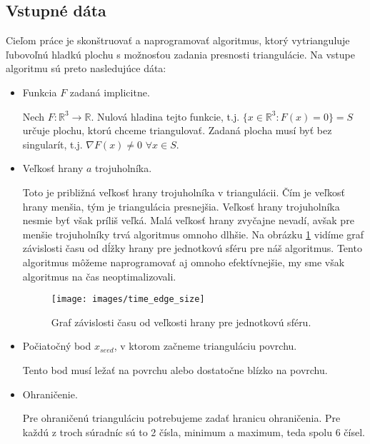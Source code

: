 \subsection{Vstupné dáta}
\label{kap:input_data}
Cieľom práce je skonštruovať a naprogramovať algoritmus, ktorý vytrianguluje ľubovoľnú hladkú plochu s 
možnosťou zadania presnosti triangulácie. Na vstupe algoritmu sú preto nasledujúce dáta:
\begin{itemize}
    \item{
        Funkcia $F$ zadaná implicitne.
        
        Nech $F:\mathbb{R}^3 \to \mathbb{R}$.
        Nulová hladina tejto funkcie, t.j. $\{x \in \mathbb{R}^3 : F(x) = 0\} = S$ určuje plochu, 
        ktorú chceme triangulovať. 
        Zadaná plocha musí byť bez singularít, t.j. $\nabla F(x) \neq 0 \,\, \forall x \in S.$
    }
    \item{
        Veľkosť hrany $a$ trojuholníka.

        Toto je približná veľkosť hrany trojuholníka v triangulácii. 
        Čím je veľkosť hrany menšia, tým je triangulácia presnejšia. Veľkosť hrany trojuholníka 
        nesmie byť však príliš veľká. Malá veľkosť hrany zvyčajne nevadí, avšak pre 
        menšie trojuholníky trvá algoritmus omnoho dlhšie. Na obrázku \ref{obr:time_edge_size}
        vidíme graf závislosti času od dĺžky hrany pre jednotkovú sféru pre náš algoritmus. 
        Tento algoritmus môžeme
        naprogramovať aj omnoho efektívnejšie, my sme však algoritmus na čas neoptimalizovali.

        \begin{figure}
            \centerline{\texttt{[image: images/time\_edge\_size]}}
            \caption[Graf závislosti času od veľkosti hrany]{Graf závislosti času od veľkosti hrany pre jednotkovú sféru.}
            \label{obr:time_edge_size}
        \end{figure}
    }
    \item{
        Počiatočný bod $x_{seed}$, v ktorom začneme trianguláciu povrchu. 

        Tento bod musí ležať na povrchu alebo dostatočne blízko na povrchu.
    }
    \item{
        Ohraničenie.

        Pre ohraničenú trianguláciu potrebujeme zadať hranicu ohraničenia. Pre každú z troch súradníc 
        sú to 2 čísla, minimum a maximum, teda spolu 6 čísel.
    }
\end{itemize}

